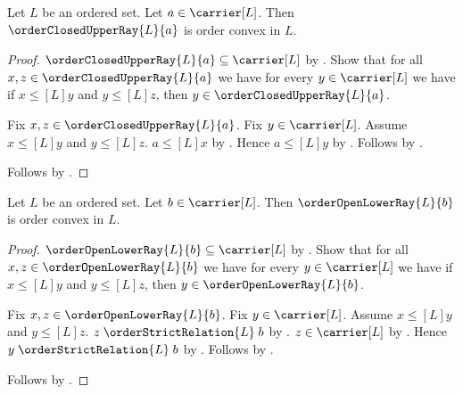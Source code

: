 \begin{proposition}\label{order_closed_upper_ray_is_order_convex}
    Let $L$ be an ordered set.
    Let $a\in\carrier[L]$.
    Then $\orderClosedUpperRay{L}{a}$ is order convex in $L$.
\end{proposition}
\begin{proof}
    $\orderClosedUpperRay{L}{a}\subseteq\carrier[L]$ by
        .
    Show that for all $x,z\in\orderClosedUpperRay{L}{a}$ we have
        for every $y\in\carrier[L]$ we have if
            $x\mathrel{\leq[L]}y$ and $y\mathrel{\leq[L]}z$, then
            $y\in\orderClosedUpperRay{L}{a}$.
    \begin{subproof}
        Fix $x,z\in\orderClosedUpperRay{L}{a}$.
        Fix $y\in\carrier[L]$.
        Assume $x\mathrel{\leq[L]}y$ and $y\mathrel{\leq[L]}z$.
        $a\mathrel{\leq[L]}x$ by .
        Hence $a\mathrel{\leq[L]}y$ by
            .
        Follows by .
    \end{subproof}
    Follows by .
\end{proof}

\begin{proposition}\label{order_open_lower_ray_is_order_convex}
    Let $L$ be an ordered set.
    Let $b\in\carrier[L]$.
    Then $\orderOpenLowerRay{L}{b}$ is order convex in $L$.
\end{proposition}
\begin{proof}
    $\orderOpenLowerRay{L}{b}\subseteq\carrier[L]$ by
        .
    Show that for all $x,z\in\orderOpenLowerRay{L}{b}$ we have
        for every $y\in\carrier[L]$ we have if
            $x\mathrel{\leq[L]}y$ and $y\mathrel{\leq[L]}z$, then
            $y\in\orderOpenLowerRay{L}{b}$.
    \begin{subproof}
        Fix $x,z\in\orderOpenLowerRay{L}{b}$.
        Fix $y\in\carrier[L]$.
        Assume $x\mathrel{\leq[L]}y$ and $y\mathrel{\leq[L]}z$.
        $z\mathrel{\orderStrictRelation{L}}b$ by
            .
        $z\in\carrier[L]$ by .
        Hence $y\mathrel{\orderStrictRelation{L}}b$ by
            .
        Follows by .
    \end{subproof}
    Follows by .
\end{proof}

